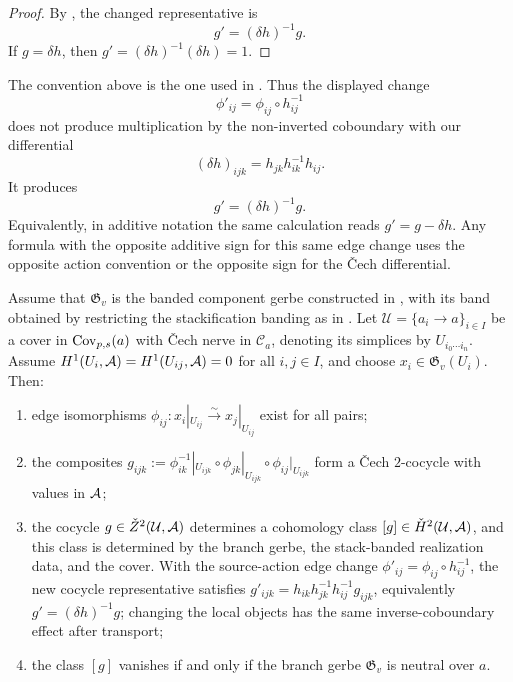\begin{proof}
By , the changed representative is
\[
g'=(\delta h)^{-1}g.
\]
If $g=\delta h$, then $g'=(\delta h)^{-1}(\delta h)=1$.
\end{proof}

\begin{remark}\label{rem:edge-change-sign-audit}
The convention above is the one used in . Thus the displayed change
\[
\phi'_{ij}=\phi_{ij}\circ h_{ij}^{-1}
\]
does not produce multiplication by the non-inverted coboundary with our
differential
\[
(\delta h)_{ijk}=h_{jk}h_{ik}^{-1}h_{ij}.
\]
It produces
\[
g'=(\delta h)^{-1}g.
\]
Equivalently, in additive notation the same calculation reads
$g'=g-\delta h$. Any formula with the opposite additive sign for this same edge change
uses the opposite action convention or the opposite sign for the \v{C}ech
differential.
\end{remark}

\begin{theorem}\label{thm:cech-bridge-compatible-realizations}
Assume that $\mathfrak G_v$ is the banded component gerbe constructed in
, with its band obtained by restricting
the stackification banding as in .
Let $\mathcal U=\{a_i\to a\}_{i\in I}$ be a cover in $\mathrm{Cov}_{p,s}(a)$ with
\v{C}ech nerve in $\mathcal C_a$, denoting its simplices by
$U_{i_0\cdots i_n}$. Assume $H^1(U_i,\mathcal{A})=H^1(U_{ij},\mathcal{A})=0$ for all
$i,j\in I$, and choose $x_i\in\mathfrak G_v(U_i)$.
Then:
\begin{enumerate}[label=(\roman*),nosep]
\item edge isomorphisms
$\phi_{ij}:x_i|_{U_{ij}}\xrightarrow{\sim}x_j|_{U_{ij}}$ exist for all pairs;
\item the composites
$g_{ijk}:=\phi_{ik}^{-1}|_{U_{ijk}}\circ\phi_{jk}|_{U_{ijk}}\circ\phi_{ij}|_{U_{ijk}}$
form a \v{C}ech $2$-cocycle with values in $\mathcal{A}$;
\item the cocycle $g\in\check Z^2(\mathcal U,\mathcal{A})$ determines a cohomology
class $[g]\in\check{H}^2(\mathcal U,\mathcal{A})$, and this class is determined by the
branch gerbe, the stack-banded realization data, and the cover. With the
source-action edge change $\phi'_{ij}=\phi_{ij}\circ h_{ij}^{-1}$, the new
cocycle representative satisfies
$g'_{ijk}=h_{ik}h_{jk}^{-1}h_{ij}^{-1}g_{ijk}$, equivalently
$g'=(\delta h)^{-1}g$; changing the local objects has the same
inverse-coboundary effect after transport;
\item the class $[g]$ vanishes if and only if the branch gerbe $\mathfrak G_v$ is neutral over $a$.
\end{enumerate}
\end{theorem}

